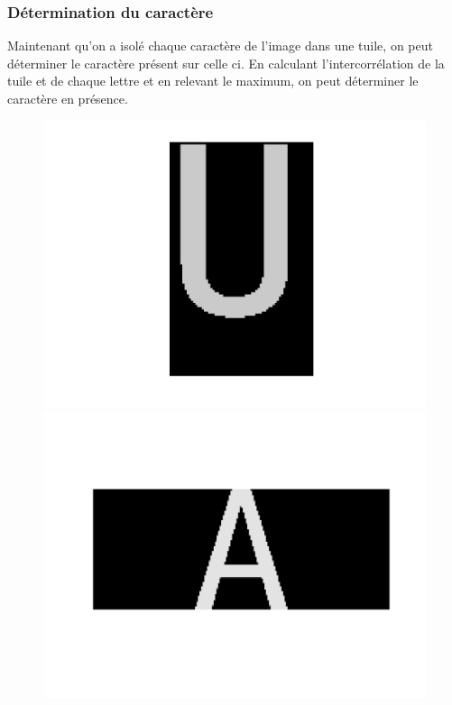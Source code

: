 \documentclass[a4paper,12pt,titlepage]{report}
\begin{document}
	\subsubsection{Détermination du caractère}
	Maintenant qu'on a isolé chaque caractère de l'image dans une tuile, on peut déterminer le caractère présent sur celle ci. En calculant l'intercorrélation de la tuile et de chaque lettre et en relevant le maximum, on peut déterminer le caractère en présence.\\
	
	\begin{figure}[h]
		\begin{center}
			\includegraphics[scale=0.25]{../illus/tuile.png}
			\includegraphics[scale=0.25]{../illus/2ech.png}

\end{center}
\end{figure}
\end{document}
